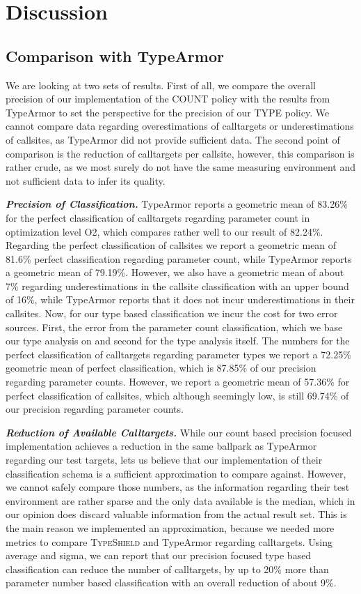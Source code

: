 \section{Discussion}
\label{chapter:Discussion}

\subsection{Comparison with TypeArmor}
\label{section:comptype}
We are looking at two sets of results. First of all, we compare the overall precision of our implementation
of the COUNT policy with the results from TypeArmor to set the perspective for the precision of our TYPE 
policy. We cannot compare data regarding overestimations of calltargets or underestimations of callsites, 
as TypeArmor did not provide sufficient data. The second point of comparison is the reduction of calltargets
per callsite, however, this comparison is rather crude, as we most surely do not have the same measuring
environment and not sufficient data to infer its quality.

\textbf{\textit{Precision of Classification.}}
TypeArmor reports a geometric mean of 83.26\% for the perfect classification of calltargets regarding 
parameter count in optimization level O2, which compares rather well to our result of 82.24\%. Regarding
the perfect classification of callsites we report a geometric mean of 81.6\% perfect classification 
regarding parameter count, while TypeArmor reports a geometric mean of 79.19\%. However, we also have
a geometric mean of about 7\% regarding underestimations in the callsite classification with an upper
bound of 16\%, while TypeArmor reports that it does not incur underestimations in their callsites.
Now, for our type based classification we incur the cost for two error sources. First, the error from
the parameter count classification, which we base our type analysis on and second for the type analysis
itself. The numbers for the perfect classification of calltargets regarding parameter types we report a
72.25\% geometric mean of perfect classification, which is 87.85\% of our precision regarding parameter
counts. However, we report a geometric mean of 57.36\%
for perfect classification of callsites, which although seemingly low, is still 69.74\% of our precision
regarding parameter counts.

\textbf{\textit{Reduction of Available Calltargets.}}
While our count based precision focused implementation achieves a reduction in the same ballpark as
TypeArmor regarding our test targets, lets us believe that our implementation of their classification
schema is a sufficient approximation to compare against. However, we cannot safely compare those numbers,
as the information regarding their test environment are rather sparse and the only data available is the
median, which in our opinion does discard valuable information from the actual result set. This is the
main reason we implemented an approximation, because we needed more metrics to compare \textsc{TypeShield}
and TypeArmor regarding calltargets. Using average and sigma, we can report that our precision focused
type based classification can reduce the number of calltargets, by up to 20\% more than parameter number
based classification with an overall reduction of about 9\%.

